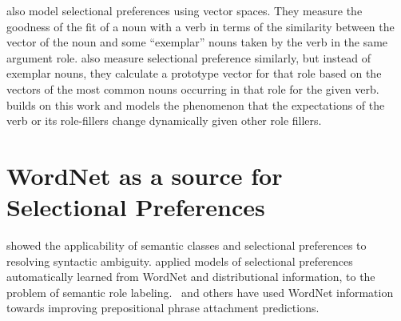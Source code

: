\cite{erk2010flexible} also model selectional preferences using vector spaces.  
They measure the 
goodness of the fit of a noun with a verb in terms of the similarity between the 
vector of the noun and 
some ``exemplar'' nouns taken by the verb in the same argument role.  
\cite{baroni2010distributional} 
also measure selectional preference similarly, but instead of exemplar nouns, 
they calculate a 
prototype vector for that role based on the vectors of the most common nouns 
occurring in that 
role for the given verb.  \cite{lenci2011composing} builds on this work and 
models the phenomenon
that the expectations of the verb or its role-fillers change dynamically given 
other role fillers.

\section{WordNet as a source for Selectional Preferences}
\cite{resnik:93} showed the applicability of semantic classes and selectional preferences to resolving syntactic ambiguity. \cite{Zapirain2013SelectionalPF} applied models of selectional preferences automatically learned from WordNet and distributional information, to the problem of semantic role labeling.~\cite{resnik:93,brill1994rule,agirre2008improving} and others have used WordNet information towards improving prepositional phrase attachment predictions.

